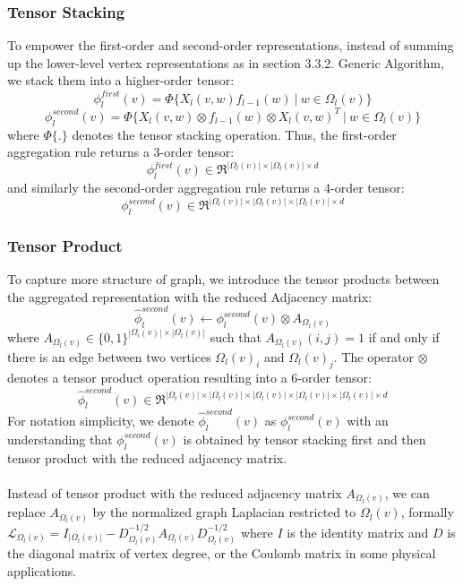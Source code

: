 \documentclass[a4paper]{article}
\begin{document}
\subsubsection{Tensor Stacking}

To empower the first-order and second-order representations, instead of summing up the lower-level vertex representations as in section 3.3.2. Generic Algorithm, we stack them into a higher-order tensor:
$$\phi_l^{first}(v) = \Phi \big\{ X_l(v, w) f_{l - 1}(w) \ \big| \ w \in \Omega_l(v) \big\}$$
$$\phi_l^{second}(v) = \Phi \big\{ X_l(v, w) \otimes f_{l - 1}(w) \otimes X_l(v, w)^T \ \big| \ w \in \Omega_l(v) \big\}$$
where $\Phi\{.\}$ denotes the tensor stacking operation. Thus, the first-order aggregation rule returns a 3-order tensor:
$$\phi_l^{first}(v) \in \Re^{|\Omega_l(v)| \times |\Omega_l(v)| \times d}$$
and similarly the second-order aggregation rule returns a 4-order tensor:
$$\phi_l^{second}(v) \in \Re^{|\Omega_l(v)| \times |\Omega_l(v)| \times |\Omega_l(v)| \times d}$$

\subsubsection{Tensor Product}

To capture more structure of graph, we introduce the tensor products between the aggregated representation with the reduced Adjacency matrix:
$$\hat{\phi}_l^{second}(v) \leftarrow \phi_l^{second}(v) \otimes A_{\Omega_l(v)}$$
where $A_{\Omega_l(v)} \in \{0, 1\}^{|\Omega_l(v)| \times |\Omega_l(v)|}$ such that $A_{\Omega_l(v)}(i, j) = 1$ if and only if there is an edge between two vertices $\Omega_l(v)_i$ and $\Omega_l(v)_j$. The operator $\otimes$ denotes a tensor product operation resulting into a 6-order tensor:
$$\hat{\phi}_l^{second}(v) \in \Re^{|\Omega_l(v)| \times |\Omega_l(v)| \times|\Omega_l(v)| \times |\Omega_l(v)| \times |\Omega_l(v)| \times d}$$
For notation simplicity, we denote $\hat{\phi}_l^{second}(v)$ as $\phi_l^{second}(v)$ with an understanding that $\phi_l^{second}(v)$ is obtained by tensor stacking first and then tensor product with the reduced adjacency matrix. \\ \\
Instead of tensor product with the reduced adjacency matrix $A_{\Omega_l(v)}$, we can replace $A_{\Omega_l(v)}$ by the normalized graph Laplacian restricted to $\Omega_l(v)$, formally $\mathcal{L}_{\Omega_l(v)} = I_{|\Omega_l(v)|} - D_{\Omega_l(v)}^{-1/2} A_{\Omega_l(v)} D_{\Omega_l(v)}^{-1/2}$ where $I$ is the identity matrix and $D$ is the diagonal matrix of vertex degree, or the Coulomb matrix in some physical applications.
\end{document}

